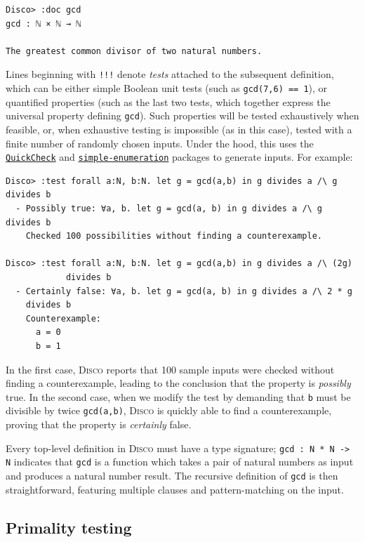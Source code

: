 \documentclass[copyright,creativecommons,11pt]{eptcs}
\newcommand{\disco}{\textsc{Disco}\xspace}
\newcommand{\pkg}[1]{\href{https://hackage.haskell.org/package/#1}{\texttt{#1}}}
\begin{document}
{\small
\begin{verbatim}
Disco> :doc gcd
gcd : ℕ × ℕ → ℕ

The greatest common divisor of two natural numbers.

\end{verbatim}
}
Lines beginning with \texttt{!!!} denote \emph{tests} attached to the
subsequent definition, which can be either simple Boolean unit tests
(such as \verb|gcd(7,6) == 1|), or quantified properties (such as the
last two tests, which together express the universal property defining
\verb|gcd|).  Such properties will be tested exhaustively when
feasible, or, when exhaustive testing is impossible (as in this case),
tested with a finite number of randomly chosen inputs. Under the hood,
this uses the \pkg{QuickCheck} \cite{claessen2000quickcheck} and
\pkg{simple-enumeration} packages to generate inputs.  For example:

{\small
\begin{verbatim}
Disco> :test forall a:N, b:N. let g = gcd(a,b) in g divides a /\ g divides b
  - Possibly true: ∀a, b. let g = gcd(a, b) in g divides a /\ g divides b
    Checked 100 possibilities without finding a counterexample.

Disco> :test forall a:N, b:N. let g = gcd(a,b) in g divides a /\ (2g) 
			divides b
  - Certainly false: ∀a, b. let g = gcd(a, b) in g divides a /\ 2 * g 
  	divides b
    Counterexample:
      a = 0
      b = 1
\end{verbatim}}

In the first case, \disco reports that 100 sample inputs were checked
without finding a counterexample, leading to the conclusion that the
property is \emph{possibly} true.  In the second case, when we modify
the test by demanding that \verb|b| must be divisible by twice
\verb|gcd(a,b)|, \disco is quickly able to find a counterexample,
proving that the property is \emph{certainly} false.

Every top-level definition in \disco must have a type signature;
\verb|gcd : N * N -> N| indicates that \verb|gcd| is a function which
takes a pair of natural numbers as input and produces a natural number
result.  The recursive definition of \verb|gcd| is then
straightforward, featuring multiple clauses and pattern-matching on
the input.

\subsection{Primality testing}
\label{sec:primetest}
\end{document}
